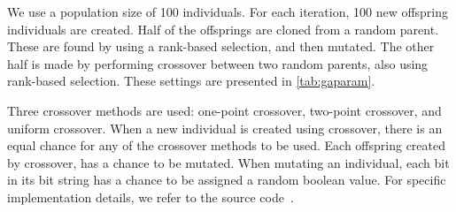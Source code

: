 We use a population size of 100 individuals. For each iteration, 100 new offspring individuals are created. Half of the offsprings are cloned from a random parent. These are found by using a rank-based selection, and then mutated. The other half is made by performing crossover between two random parents, also using rank-based selection. These settings are presented in \cref{tab:gaparam}.

Three crossover methods are used: one-point crossover, two-point crossover, and uniform crossover. When a new individual is created using crossover, there is an equal chance for any of the crossover methods to be used. Each offspring created by crossover, has a  chance to be mutated. When mutating an individual, each bit in its bit string has a  chance to be assigned a random boolean value. For specific implementation details, we refer to the source code~\cite{mbm:kmc:ekoGA}.






